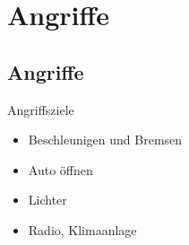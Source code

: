 \section{Angriffe}

\subsection{Angriffe}

\begin{frame}{Angriffsziele}
    \begin{itemize}
        \item Beschleunigen und Bremsen
        \item Auto öffnen
        \item Lichter
        \item Radio, Klimaanlage
    \end{itemize}
\end{frame}

